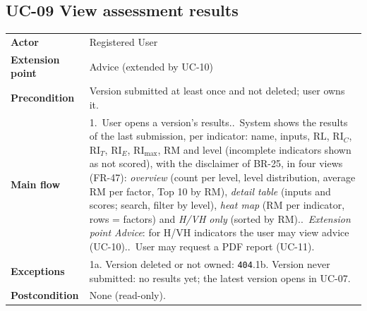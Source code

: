 \documentclass[11pt,a4paper]{article}
\newcommand{\RL}{\mathrm{RL}}
\newcommand{\RIC}{\mathrm{RI}_{C}}
\newcommand{\RIT}{\mathrm{RI}_{T}}
\newcommand{\RIE}{\mathrm{RI}_{E}}
\newcommand{\RImax}{\mathrm{RI}_{\max}}
\newcommand{\RM}{\mathrm{RM}}
\begin{document}
\noindent\begin{minipage}{\linewidth}
\subsection*{UC-09 View assessment results}
\begin{tabularx}{\linewidth}{@{}>{\raggedright\leavevmode\bfseries\color{creBlue}}p{2.6cm} Y@{}}
\toprule
Actor & Registered User \\
Extension point & Advice (extended by UC-10) \\
Precondition & Version submitted at least once and not deleted; user owns it. \\
Main flow & 1.~User opens a version's results..~System shows the results of the last submission, per indicator: name, inputs, $\RL$, $\RIC$, $\RIT$, $\RIE$, $\RImax$, $\RM$ and level (incomplete indicators shown as not scored), with the disclaimer of BR-25, in four views (FR-47): \emph{overview} (count per level, level distribution, average $\RM$ per factor, Top 10 by $\RM$), \emph{detail table} (inputs and scores; search, filter by level), \emph{heat map} ($\RM$ per indicator, rows = factors) and \emph{H/VH only} (sorted by $\RM$)..~\emph{Extension point Advice}: for H/VH indicators the user may view advice (UC-10)..~User may request a PDF report (UC-11). \\
Exceptions & 1a. Version deleted or not owned: \texttt{404}.\newline 1b. Version never submitted: no results yet; the latest version opens in UC-07. \\
Postcondition & None (read-only). \\
\bottomrule
\end{tabularx}
\end{minipage}
\par\medskip
\end{document}
